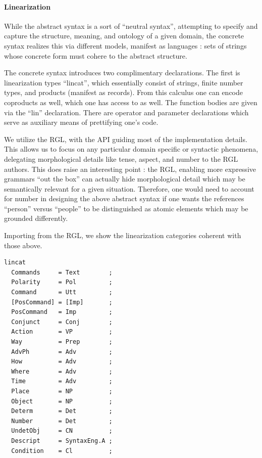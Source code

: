 \documentclass{article}
\begin{document}
\paragraph{Linearization}

While the abstract syntax is a sort of ``neutral syntax'', attempting to specify
and capture the structure, meaning, and ontology of a given domain, the concrete
syntax realizes this via different models, manifest as languages : sets of
strings whose concrete form must cohere to the abstract structure.

The concrete syntax introduces two complimentary declarations. The first is
linearization types ``lincat'', which essentially consist of strings, finite
number types, and products (manifest as records). From this calculus one can
encode coproducts as well, which one has access to as well. The function bodies
are given via the ``lin'' declaration. There are operator and parameter
declarations which serve as auxiliary means of prettifying one's code.

We utilize the RGL, with the API guiding most of the implementation details.
This allows us to focus on any particular domain specific or syntactic
phenomena, delegating morphological details like tense, aspect, and number to the RGL
authors. This does raise an interesting point : the RGL, enabling more
expressive grammars ``out the box'' can actually hide morphological detail which
may be semantically relevant for a given situation. Therefore, one would need to
account for number in designing the above abstract syntax if one wants the
references ``person'' versus ``people'' to be distinguished as atomic elements
which may be grounded differently.

Importing from the RGL, we show the linearization categories coherent with those above.

\begin{verbatim}
lincat
  Commands     = Text        ;
  Polarity     = Pol         ;
  Command      = Utt         ;
  [PosCommand] = [Imp]       ;
  PosCommand   = Imp         ;
  Conjunct     = Conj        ;
  Action       = VP          ;
  Way          = Prep        ;
  AdvPh        = Adv         ;
  How          = Adv         ;
  Where        = Adv         ;
  Time         = Adv         ;
  Place        = NP          ;
  Object       = NP          ;
  Determ       = Det         ;
  Number       = Det         ;
  UndetObj     = CN          ;
  Descript     = SyntaxEng.A ;
  Condition    = Cl          ;
\end{verbatim}
\end{document}
